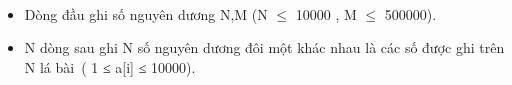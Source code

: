  
\begin{itemize}
	\item Dòng đầu ghi số nguyên dương N,M (N $\le$ 10000 , M $\le$ 500000).
	\item N dòng sau ghi N số nguyên dương đôi một khác nhau là các số được ghi trên N lá bài ( 1 ≤ a[i] ≤ 10000).
\end{itemize}

 
